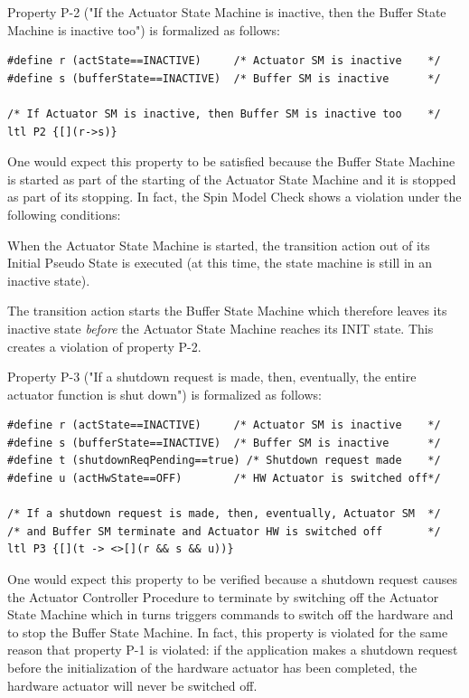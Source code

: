 \documentclass[definition]{../fwprofile}
\begin{document}
Property P-2 ("If the Actuator State Machine is inactive, then the Buffer State Machine is inactive too") is formalized as follows:

\begin{lstlisting}
#define r (actState==INACTIVE)     /* Actuator SM is inactive    */
#define s (bufferState==INACTIVE)  /* Buffer SM is inactive      */

/* If Actuator SM is inactive, then Buffer SM is inactive too    */
ltl P2 {[](r->s)}
\end{lstlisting}

One would expect this property to be satisfied because the Buffer State Machine is started as part of the starting of the Actuator State Machine and it is stopped as part of its stopping. In fact, the Spin Model Check shows a violation under the following conditions:

\begin{fw_itemize}
\item When the Actuator State Machine is started, the transition action out of its Initial Pseudo State is executed (at this time, the state machine is still in an inactive state).
\item The transition action starts the Buffer State Machine which therefore leaves its inactive state \textit{before} the Actuator State Machine reaches its INIT state. This creates a violation of property P-2.
\end{fw_itemize}

Property P-3 ("If a shutdown request is made, then, eventually, the entire actuator function is shut down") is formalized as follows:

\begin{lstlisting}
#define r (actState==INACTIVE)     /* Actuator SM is inactive    */
#define s (bufferState==INACTIVE)  /* Buffer SM is inactive      */
#define t (shutdownReqPending==true) /* Shutdown request made    */
#define u (actHwState==OFF)        /* HW Actuator is switched off*/

/* If a shutdown request is made, then, eventually, Actuator SM  */
/* and Buffer SM terminate and Actuator HW is switched off       */
ltl P3 {[](t -> <>[](r && s && u))}
\end{lstlisting}

One would expect this property to be verified because a shutdown request causes the Actuator Controller Procedure to terminate by switching off the Actuator State Machine which in turns triggers commands to switch off the hardware and to stop the Buffer State Machine. In fact, this property is violated for the same reason that property P-1 is violated: if the application makes a shutdown request before the initialization of the hardware actuator has been completed, the hardware actuator will never be switched off.
\end{document}
